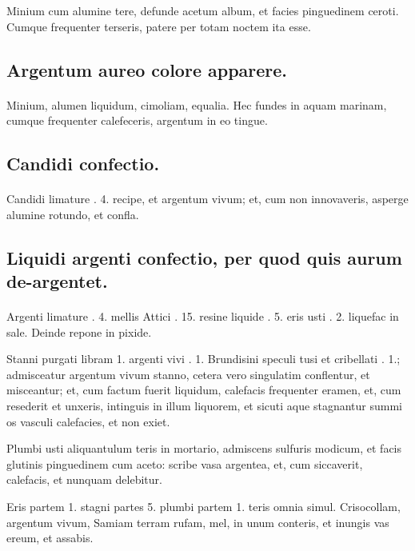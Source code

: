 \documentclass[a4paper, 11pt, oneside, polutonikogreek, italian]{article}
\begin{document}
Minium cum alumine tere, defunde acetum album, et facies pinguedinem ceroti. Cumque frequenter terseris, patere per totam noctem ita esse.

\subsection{Argentum aureo colore apparere.}
\paragraph{}
Minium, alumen liquidum, cimoliam, equalia. Hec fundes in aquam marinam, cumque frequenter calefeceris, argentum in eo tingue.

\subsection{Candidi confectio.}
\paragraph{}
Candidi limature \roundz. 4. recipe, et argentum vivum; et, cum non innovaveris, asperge alumine rotundo, et confla.

\subsection{Liquidi argenti confectio, per quod quis aurum de-argentet.}
\paragraph{}
Argenti limature \roundz. 4. mellis Attici \roundz. 15. resine liquide \roundz. 5. eris usti \roundz. 2. liquefac in sale. Deinde repone in pixide.

Stanni purgati libram 1. argenti vivi \roundz. 1. Brundisini speculi tusi et cribellati \roundz. 1.; admisceatur argentum vivum stanno, cetera vero singulatim conflentur, et misceantur; et, cum factum fuerit liquidum, calefacis frequenter eramen, et, cum resederit et unxeris, intinguis in illum liquorem, et sicuti aque stagnantur summi os vasculi calefacies, et non exiet.

Plumbi usti aliquantulum teris in mortario, admiscens sulfuris modicum, et facis glutinis pinguedinem cum aceto: scribe vasa argentea, et, cum siccaverit, calefacis, et nunquam delebitur.

Eris partem 1. stagni partes 5. plumbi partem 1. teris omnia simul. Crisocollam, argentum vivum, Samiam terram rufam, mel, in unum conteris, et inungis vas ereum, et assabis.
\end{document}
